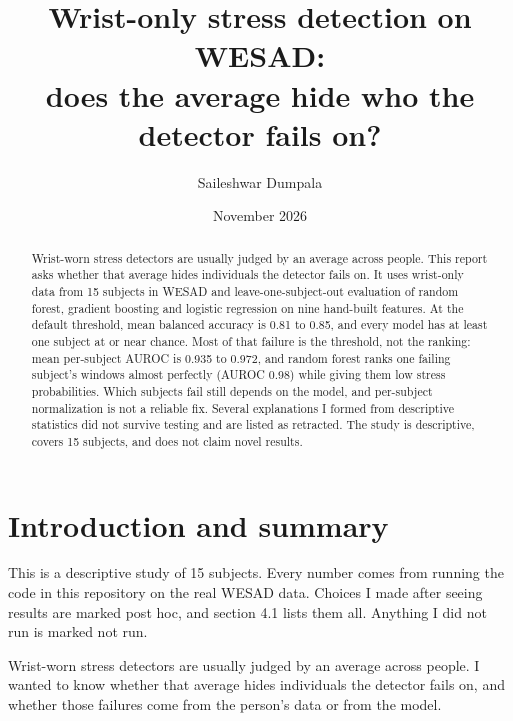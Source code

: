 \documentclass[11pt]{article}
\title{Wrist-only stress detection on WESAD:\\does the average hide who the detector fails on?}
\author{Saileshwar Dumpala}
\date{November 2026}
\begin{document}
\maketitle

\begin{abstract}
Wrist-worn stress detectors are usually judged by an average across people. This report asks whether that average hides individuals the detector fails on. It uses wrist-only data from 15 subjects in WESAD and leave-one-subject-out evaluation of random forest, gradient boosting and logistic regression on nine hand-built features. At the default threshold, mean balanced accuracy is 0.81 to 0.85, and every model has at least one subject at or near chance. Most of that failure is the threshold, not the ranking: mean per-subject AUROC is 0.935 to 0.972, and random forest ranks one failing subject's windows almost perfectly (AUROC 0.98) while giving them low stress probabilities. Which subjects fail still depends on the model, and per-subject normalization is not a reliable fix. Several explanations I formed from descriptive statistics did not survive testing and are listed as retracted. The study is descriptive, covers 15 subjects, and does not claim novel results.
\end{abstract}

\hypertarget{introduction-and-summary}{%
\section{Introduction and summary}\label{introduction-and-summary}}

This is a descriptive study of 15 subjects. Every number comes from
running the code in this repository on the real WESAD data. Choices I
made after seeing results are marked post hoc, and section 4.1 lists
them all. Anything I did not run is marked not run.

Wrist-worn stress detectors are usually judged by an average across
people. I wanted to know whether that average hides individuals the
detector fails on, and whether those failures come from the person's
data or from the model.
\end{document}
